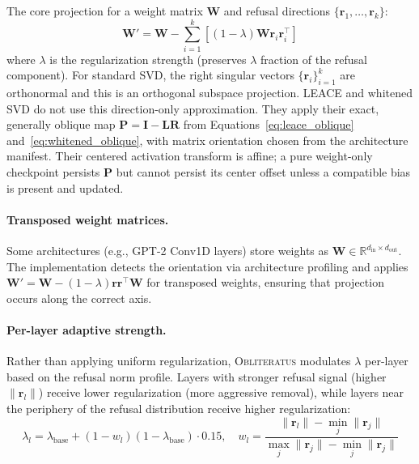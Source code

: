 \documentclass[11pt]{article}
\begin{document}
The core projection for a weight matrix $\mathbf{W}$ and refusal directions $\{\mathbf{r}_1, \ldots, \mathbf{r}_k\}$:
\begin{equation}
    \mathbf{W}' = \mathbf{W} - \sum_{i=1}^k \left[(1-\lambda)\mathbf{W}\mathbf{r}_i\mathbf{r}_i^\top\right]
    \label{eq:core_projection}
\end{equation}
where $\lambda$ is the regularization strength (preserves $\lambda$ fraction of the refusal component). For standard SVD, the right singular vectors $\{\mathbf{r}_i\}_{i=1}^k$ are orthonormal and this is an orthogonal subspace projection. LEACE and whitened SVD do not use this direction-only approximation. They apply their exact, generally oblique map $\mathbf{P}=\mathbf{I}-\mathbf{L}\mathbf{R}$ from Equations~\ref{eq:leace_oblique} and~\ref{eq:whitened_oblique}, with matrix orientation chosen from the architecture manifest. Their centered activation transform is affine; a pure weight-only checkpoint persists $\mathbf{P}$ but cannot persist its center offset unless a compatible bias is present and updated.

\paragraph{Transposed weight matrices.}
Some architectures (e.g., GPT-2 Conv1D layers) store weights as $\mathbf{W} \in \mathbb{R}^{d_{\text{in}} \times d_{\text{out}}}$. The implementation detects the orientation via architecture profiling and applies $\mathbf{W}' = \mathbf{W} - (1-\lambda)\mathbf{r}\mathbf{r}^\top\mathbf{W}$ for transposed weights, ensuring that projection occurs along the correct axis.

\paragraph{Per-layer adaptive strength.}
Rather than applying uniform regularization, \textsc{Obliteratus} modulates $\lambda$ per-layer based on the refusal norm profile. Layers with stronger refusal signal (higher $\|\mathbf{r}_l\|$) receive lower regularization (more aggressive removal), while layers near the periphery of the refusal distribution receive higher regularization:
\begin{equation}
    \lambda_l = \lambda_{\text{base}} + (1 - w_l)(1 - \lambda_{\text{base}}) \cdot 0.15, \quad
    w_l = \frac{\|\mathbf{r}_l\| - \min_j \|\mathbf{r}_j\|}{\max_j \|\mathbf{r}_j\| - \min_j \|\mathbf{r}_j\|}
    \label{eq:adaptive_strength}
\end{equation}
\end{document}
